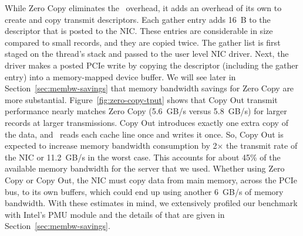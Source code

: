 While Zero Copy eliminates the \memcpy ~overhead, it adds an overhead of its own to create and copy transmit descriptors.
Each gather entry adds 16~B to the descriptor that is posted to the NIC.
These entries are considerable in size compared to
small records, and they are copied twice. The gather list
is first staged on the thread's stack and passed to the user level NIC driver. Next,
the driver makes a posted PCIe write by copying the descriptor (including the
gather entry) into a memory-mapped device buffer.
We will see later in Section~\ref{sec:membw-savings} that memory bandwidth savings for Zero Copy are more substantial.
Figure~\ref{fig:zero-copy-tput} shows that Copy Out transmit performance nearly
matches Zero Copy (5.6~GB/s versus 5.8~GB/s) for larger records at larger transmissions. Copy Out introduces exactly one
extra copy of the data, and \memcpy~reads each cache line once and writes it
once. So, Copy Out is expected to increase memory bandwidth consumption
by 2$\times$ the transmit rate of the NIC or 11.2~GB/s in the worst case. This
accounts for about 45\% of the available memory bandwidth for the server that we used. Whether
using Zero Copy or Copy Out, the NIC must copy data from main memory, across the PCIe bus, to its own buffers, which
could end up using another 6~GB/s of memory bandwidth. With these estimates in mind, we extensively profiled
 our benchmark with Intel's PMU module and the details of that are given in Section~\ref{sec:membw-savings}.
\newline





